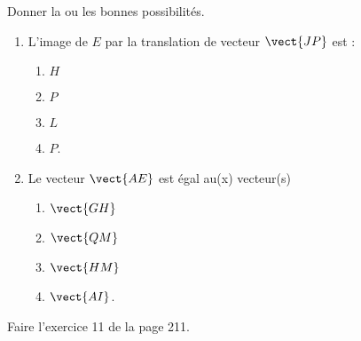 
\begin{exercice}\label{exosmath-0594}

\begin{wrapfigure}{r}{5.0cm}
   \vspace{-0.5cm}        %
   \centering
   
\end{wrapfigure}

Donner la ou les bonnes possibilités.

        \begin{enumerate}
            \item
                L'image de \( E\) par la translation de vecteur \( \vect{ JP }\) est :
                \begin{multicols}{3}
                    \begin{enumerate}
                        \item $H$\item $P$\item \( L\)\item \( P\).
                    \end{enumerate}
                \end{multicols}
            \item
                Le vecteur \( \vect{ AE }\) est égal au(x) vecteur(s)
                \begin{multicols}{3}
                    \begin{enumerate}
                        \item \( \vect{ GH }\)\item \( \vect{ QM }\)\item \( \vect{ HM }\)\item \( \vect{ AI }\).
                    \end{enumerate}
                \end{multicols}
        \end{enumerate}

Faire l'exercice 11 de la page 211.

\end{exercice}
